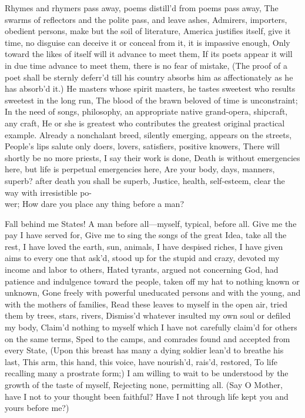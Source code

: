 \documentclass[11pt]{book}
\newenvironment {poem} [1]
 {\titulus{#1}%
  \versus
  \Nstanza{0}%
  \numerus{1}}
 {\endversus}
\begin{document}
\begin{poem}{By Blue Ontario's Shore}
\stropha %

Rhymes and rhymers pass away, poems distill'd from poems pass away,
The swarms of reflectors and the polite pass, and leave ashes,
Admirers, importers, obedient persons, make but the soil of literature,
America justifies itself, give it time, no disguise can deceive it %
    or conceal from it, it is impassive enough,
Only toward the likes of itself will it advance to meet them,
If its poets appear it will in due time advance to meet them, there %
    is no fear of mistake,
(The proof of a poet shall be sternly deferr'd till his country %
    absorbs him as affectionately as he has absorb'd it.)
     \vacua
He masters whose spirit masters, he tastes sweetest who results %
    sweetest in the long run,
The blood of the brawn beloved of time is unconstraint;
In the need of songs, philosophy, an appropriate native grand-opera, %
    shipcraft, any craft,
He or she is greatest who contributes the greatest original %
    practical example.
     \vacua
Already a nonchalant breed, silently emerging, appears on the streets,
People's lips salute only doers, lovers, satisfiers, positive knowers,
There will shortly be no more priests, I say their work is done,
Death is without emergencies here, but life is perpetual emergencies here,
Are your body, days, manners, superb? after death you shall be superb,
Justice, health, self-esteem, clear the way with irresistible po-\\wer;
How dare you place any thing before a man?

\stropha %

Fall behind me States!
A man before all---myself, typical, before all.
     \vacua
Give me the pay I have served for,
Give me to sing the songs of the great Idea, take all the rest,
I have loved the earth, sun, animals, I have despised riches,
I have given aims to every one that ask'd, stood up for the stupid %
    and crazy, devoted my income and labor to others,
Hated tyrants, argued not concerning God, had patience and indulgence %
    toward the people, taken off my hat to nothing known or unknown,
\DriveOut Gone freely with powerful uneducated persons and with the young, %
    and with the mothers of families,
Read these leaves to myself in the open air, tried them by trees, %
    stars, rivers,
Dismiss'd whatever insulted my own soul or defiled my body,
Claim'd nothing to myself which I have not carefully claim'd for %
    others on the same terms,
Sped to the camps, and comrades found and accepted from every State,
(Upon this breast has many a dying soldier lean'd to breathe his last,
This arm, this hand, this voice, have nourish'd, rais'd, restored,
To life recalling many a prostrate form;)
I am willing to wait to be understood by the growth of the taste of myself,
Rejecting none, permitting all.
     \vacua
(Say O Mother, have I not to your thought been faithful?
Have I not through life kept you and yours before me?)


\end{poem}
\end{document}
